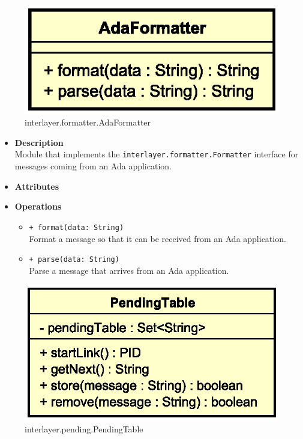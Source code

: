 
\begin{figure}[H]
  \centering
  \includegraphics[width=.4\columnwidth]{images/solution/mw/int/adaform.eps}
  \caption{interlayer.formatter.AdaFormatter}
  \label{fig:mw-interlayer-formatter-adaformatter}
\end{figure}

\FloatBarrier
\begin{itemize}
  \item \textbf{Description} \\
    Module that implements the \texttt{interlayer.formatter.Formatter}
    interface for messages coming from an Ada application.
  \item \textbf{Attributes}
  \item \textbf{Operations}
  \begin{itemize}
    \item \texttt{+ format(data: String)} \\
    Format a message so that it can be received from an Ada application.
    \item \texttt{+ parse(data: String)} \\
    Parse a message that arrives from an Ada application.
  \end{itemize}
\end{itemize}


\begin{figure}[H]
  \centering
  \includegraphics[width=.5\columnwidth]{images/solution/mw/int/pendtbl.eps}
  \caption{interlayer.pending.PendingTable}
  \label{fig:mw-interlayer-pending-pendingtable}
\end{figure}

